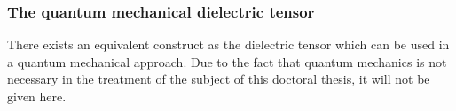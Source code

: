 \documentclass[a4paper,11pt]{thesis}
\begin{document}

\subsubsection{The quantum mechanical dielectric tensor}
There exists an equivalent construct as the dielectric tensor which can be used in a quantum mechanical approach. Due to the fact that quantum mechanics is not necessary in the treatment of the subject of this doctoral thesis, it will not be given here.
\end{document}

